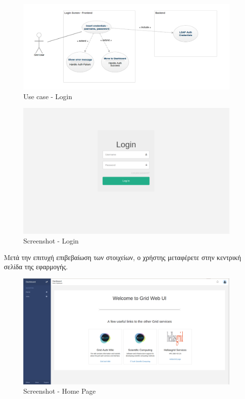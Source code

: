 \begin{figure}[t]
\caption{Use case - Login}
\includegraphics[width=16cm]{../images/login-use-case.png}
\centering
\end{figure}
\clearpage

\begin{figure}[t]
\caption{Screenshot - Login}
\includegraphics[width=16cm]{../images/login-screenshot.png}
\centering
\end{figure}
\clearpage

Μετά την επιτυχή επιβεβαίωση των στοιχείων, ο χρήστης μεταφέρετε στην κεντρική σελίδα της εφαρμογής.

\begin{figure}[t]
\caption{Screenshot - Home Page}
\includegraphics[width=16cm]{../images/home-page-screenshot.png}
\centering
\end{figure}
\clearpage



